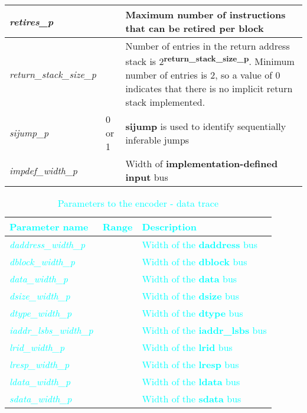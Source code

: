 \begin{table}[h]
\begin{tabulary}{\textwidth}{|l|l|p{100mm}|}
        \hline
        \textit{retires\_p} &  & Maximum number of instructions that can be retired per block \\
        \hline
        \textit{return\_stack\_size\_p} &  & Number of entries in the return address stack is 2\textsuperscript{\textbf{return\_stack\_size\_p}}.
                                    Minimum number of entries is 2, so a value of 0 indicates that there is no implicit return stack implemented.\\
        \hline
        \textit{sijump\_p} & 0 or 1 & \textbf{sijump} is used to identify sequentially inferable jumps\\
        \hline
        \textit{impdef\_width\_p} & & Width of \textbf{implementation-defined input} bus \\
        \hline
    \end{tabulary}
\end{table}

\FloatBarrier

\begin{table}[h]
    \centering
    \caption{\textcolor{cyan}{Parameters to the encoder - data trace}}
    \label{tab:dparameters}
    \begin{tabulary}{\textwidth}{|l|l|p{100mm}|}
        \hline
        \textbf{\textcolor{cyan}{Parameter name}} & \textbf{\textcolor{cyan}{Range}} & \textbf{\textcolor{cyan}{Description}} \\
        \hline
        \textit{\textcolor{cyan}{daddress\_width\_p}} & & \textcolor{cyan}{Width of the \textbf{daddress} bus}\\
        \hline
        \textit{\textcolor{cyan}{dblock\_width\_p}} & & \textcolor{cyan}{Width of the \textbf{dblock} bus}\\
        \hline
        \textit{\textcolor{cyan}{data\_width\_p}} & & \textcolor{cyan}{Width of the \textbf{data} bus}\\
        \hline
        \textit{\textcolor{cyan}{dsize\_width\_p}} & & \textcolor{cyan}{Width of the \textbf{dsize} bus}\\
        \hline
        \textit{\textcolor{cyan}{dtype\_width\_p}} & & \textcolor{cyan}{Width of the \textbf{dtype} bus}\\
        \hline
        \textit{\textcolor{cyan}{iaddr\_lsbs\_width\_p}} & & \textcolor{cyan}{Width of the \textbf{iaddr\_lsbs} bus}\\
        \hline
        \textit{\textcolor{cyan}{lrid\_width\_p}} & & \textcolor{cyan}{Width of the \textbf{lrid} bus}\\
        \hline
        \textit{\textcolor{cyan}{lresp\_width\_p}} & & \textcolor{cyan}{Width of the \textbf{lresp} bus}\\
        \hline
        \textit{\textcolor{cyan}{ldata\_width\_p}} & & \textcolor{cyan}{Width of the \textbf{ldata} bus}\\
        \hline
        \textit{\textcolor{cyan}{sdata\_width\_p}} & & \textcolor{cyan}{Width of the \textbf{sdata} bus}\\
        \hline
    \end{tabulary}
\end{table}

